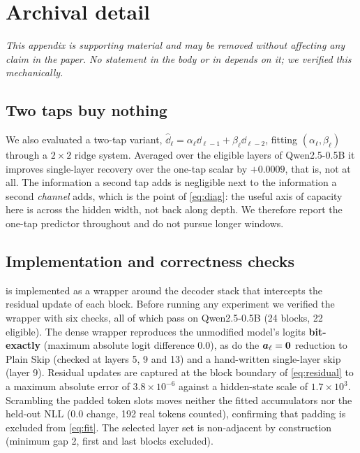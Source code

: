 \clearpage
\section{Archival detail}
\label{sec:app-archival}

\emph{This appendix is supporting material and may be removed without affecting any claim in the
paper. No statement in the body or in  depends on it; we verified this
mechanically.}
\subsection{Two taps buy nothing}
\label{sec:app-ar2}

We also evaluated a two-tap variant, $\widehat{\dd}_\ell = \alpha_\ell \dd_{\ell-1}
+ \beta_\ell \dd_{\ell-2}$, fitting $(\alpha_\ell, \beta_\ell)$ through a
$2\times2$ ridge system. Averaged over the eligible layers of Qwen2.5-0.5B it
improves single-layer recovery over the one-tap scalar by $+0.0009$, that
is, not at all. The information a second tap adds is negligible next to the
information a second \emph{channel} adds, which is the point of \cref{eq:diag}: the
useful axis of capacity here is across the hidden width, not back along depth. We
therefore report the one-tap predictor throughout and do not pursue longer windows.

\subsection{Implementation and correctness checks}
\label{sec:app-correctness}

\mname is implemented as a wrapper around the decoder stack that intercepts the
residual update of each block. Before running any experiment we verified the
wrapper with six checks, all of which pass on Qwen2.5-0.5B (24 blocks, 22
eligible). The dense wrapper reproduces the unmodified model's logits
\textbf{bit-exactly} (maximum absolute logit difference $0.0$), as do the
$\bm{a}_\ell = \bm{0}$ reduction to Plain Skip (checked at layers 5, 9 and
13) and a hand-written single-layer skip (layer 9). Residual updates are
captured at the block boundary of \cref{eq:residual} to a maximum absolute error of
$3.8 \times 10^{-6}$ against a hidden-state scale of $1.7 \times 10^{3}$.
Scrambling the padded token slots moves neither the fitted accumulators nor the
held-out NLL ($0.0$ change, 192 real tokens counted), confirming that
padding is excluded from \cref{eq:fit}. The selected layer set is non-adjacent by
construction (minimum gap 2, first and last blocks excluded).

